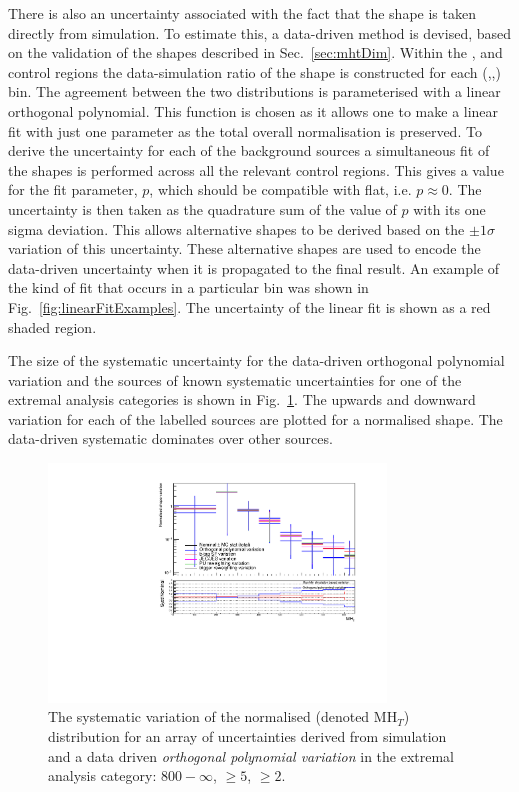 There is also an uncertainty associated with the fact that the \MHT shape
is taken directly from simulation. To estimate this, a data-driven
method is devised, based on the validation of the \MHT shapes
described in Sec.~\ref{sec:mhtDim}. Within the \mj, \mmj and \gj
control regions the data-simulation ratio of the \MHT shape is
constructed for each (\HT,\nj,\nb) bin. The agreement between the two
distributions is parameterised with a linear orthogonal polynomial.
This function is chosen as it allows one to make a linear fit with
just one parameter as the total overall normalisation is preserved.
To derive the uncertainty for each of the background sources
a simultaneous fit of the \MHT shapes is performed across
all the relevant control regions. This gives a value for the fit
parameter, $p$, which should be compatible with flat, i.e.
$p\approx0$. The uncertainty is then taken as the quadrature sum of
the value of $p$ with its one sigma deviation. This allows alternative
\MHT shapes to be derived based on the $\pm 1\sigma$ variation of this
uncertainty. These alternative shapes are used to encode the
data-driven uncertainty when it is propagated to the final result. An
example of the kind of fit that occurs in a particular bin was shown
in Fig.~\ref{fig:linearFitExamples}. The uncertainty of the linear fit is shown as a red
shaded region.

The size of the systematic uncertainty for the data-driven orthogonal
polynomial variation and the sources of known systematic uncertainties
for one of the extremal analysis categories is shown in
Fig.~\ref{fig:mcCompLow}.
The upwards and downward variation for each of the labelled sources
are plotted for a normalised \MHT shape. The data-driven systematic
dominates over other sources.

\begin{figure}[h!]
  \centering
  \includegraphics[width=0.8\textwidth]{figs/analysis/mhtShape/totalSMS-T1tttt_mGluino-1000_mLSP-100_25ns_mht_ge5j_ge3b_800.pdf}
  \caption{The systematic variation of the normalised \MHT (denoted MH$_T$)
  distribution for an array of uncertainties derived from simulation
  and a data driven \emph{orthogonal polynomial variation} in the
  extremal analysis category: \scalht $800-\infty$, \njet $\geq 5$, \nb $\geq 2$.}
  \label{fig:mcCompLow}
\end{figure}

